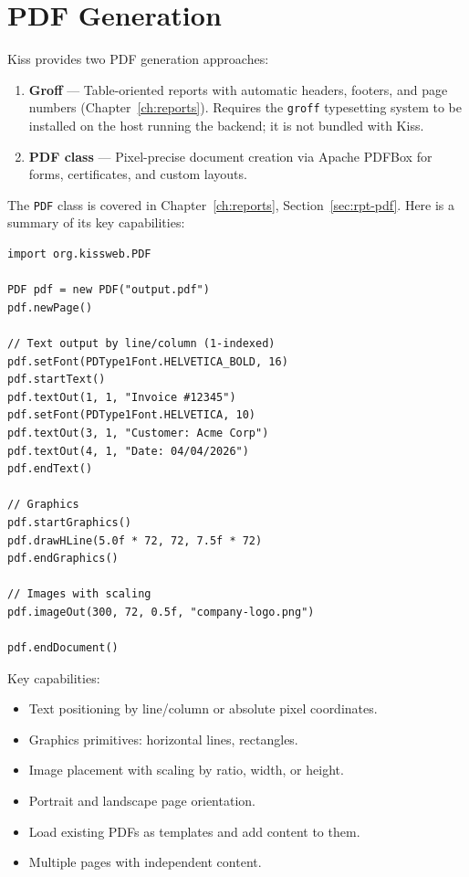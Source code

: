 \section{PDF Generation}
\label{sec:file-pdf}

Kiss provides two PDF generation approaches:

\begin{enumerate}
  \item \textbf{Groff} --- Table-oriented reports with automatic headers, footers, and page numbers (Chapter~\ref{ch:reports}).  Requires the \texttt{groff} typesetting system to be installed on the host running the backend; it is not bundled with Kiss.
  \item \textbf{PDF class} --- Pixel-precise document creation via Apache PDFBox for forms, certificates, and custom layouts.
\end{enumerate}

\noindent
The \texttt{PDF} class is covered in Chapter~\ref{ch:reports}, Section~\ref{sec:rpt-pdf}.  Here is a summary of its key capabilities:

\begin{lstlisting}[style=groovy]
import org.kissweb.PDF

PDF pdf = new PDF("output.pdf")
pdf.newPage()

// Text output by line/column (1-indexed)
pdf.setFont(PDType1Font.HELVETICA_BOLD, 16)
pdf.startText()
pdf.textOut(1, 1, "Invoice #12345")
pdf.setFont(PDType1Font.HELVETICA, 10)
pdf.textOut(3, 1, "Customer: Acme Corp")
pdf.textOut(4, 1, "Date: 04/04/2026")
pdf.endText()

// Graphics
pdf.startGraphics()
pdf.drawHLine(5.0f * 72, 72, 7.5f * 72)
pdf.endGraphics()

// Images with scaling
pdf.imageOut(300, 72, 0.5f, "company-logo.png")

pdf.endDocument()
\end{lstlisting}

\noindent
Key capabilities:

\begin{itemize}
  \item Text positioning by line/column or absolute pixel coordinates.
  \item Graphics primitives: horizontal lines, rectangles.
  \item Image placement with scaling by ratio, width, or height.
  \item Portrait and landscape page orientation.
  \item Load existing PDFs as templates and add content to them.
  \item Multiple pages with independent content.
\end{itemize}

